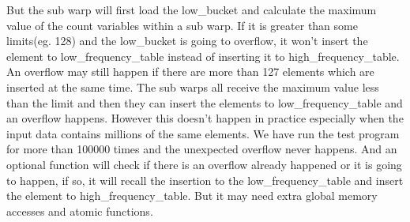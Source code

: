 \documentclass[conference]{IEEEtran}
\begin{document}
But the sub warp will first load the low\_bucket and calculate the maximum value of the count variables within a sub warp. If it is greater than some limits(eg. 128) and the low\_bucket is going to overflow, it won't insert the element to low\_frequency\_table instead of inserting it to high\_frequency\_table. An overflow may still happen if there are more than 127 elements which are inserted at the same time. The sub warps all receive the maximum value less than the limit and then they can insert the elements to low\_frequency\_table and an overflow happens. However this doesn't happen in practice especially when the input data contains millions of the same elements. We have run the test program for more than 100000 times and the unexpected overflow never happens. And an optional function will check if there is an overflow already happened or it is going to happen, if so, it will recall the insertion to the low\_frequency\_table and insert the element to high\_frequency\_table. But it may need extra global memory accesses and atomic functions.
\end{document}
